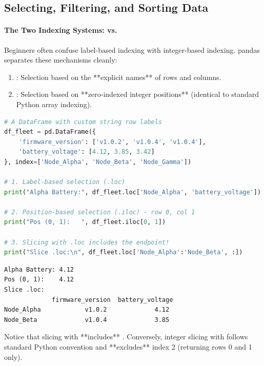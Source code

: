 \subsection{Selecting, Filtering, and Sorting Data}

\paragraph{The Two Indexing Systems:  vs. }
Beginners often confuse label-based indexing with integer-based indexing. pandas separates these mechanisms cleanly:
\begin{enumerate}
    \item \textbf{}: Selection based on the **explicit names** of rows and columns.
    \item \textbf{}: Selection based on **zero-indexed integer positions** (identical to standard Python array indexing).
\end{enumerate}

\begin{lstlisting}[language=Python]
# A DataFrame with custom string row labels
df_fleet = pd.DataFrame({
    'firmware_version': ['v1.0.2', 'v1.0.4', 'v1.0.4'],
    'battery_voltage': [4.12, 3.85, 3.42]
}, index=['Node_Alpha', 'Node_Beta', 'Node_Gamma'])

# 1. Label-based selection (.loc)
print("Alpha Battery:", df_fleet.loc['Node_Alpha', 'battery_voltage'])

# 2. Position-based selection (.iloc) - row 0, col 1
print("Pos (0, 1):   ", df_fleet.iloc[0, 1])

# 3. Slicing with .loc includes the endpoint!
print("Slice .loc:\n", df_fleet.loc['Node_Alpha':'Node_Beta', :])
\end{lstlisting}

\begin{lstlisting}[style=outputstyle]
Alpha Battery: 4.12
Pos (0, 1):    4.12
Slice .loc:
             firmware_version  battery_voltage
Node_Alpha            v1.0.2             4.12
Node_Beta             v1.0.4             3.85
\end{lstlisting}

\begin{warning}
Notice that slicing with  **includes** . Conversely, integer slicing with  follows standard Python convention and **excludes** index 2 (returning rows 0 and 1 only).
\end{warning}

